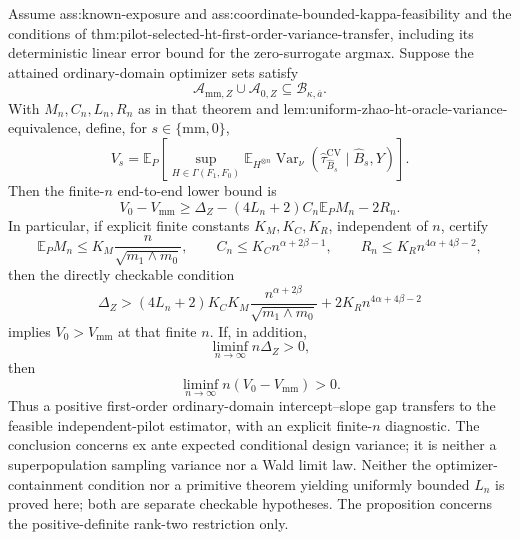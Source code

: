 Assume ass:known-exposure and ass:coordinate-bounded-kappa-feasibility and the conditions of thm:pilot-selected-ht-first-order-variance-transfer, including its deterministic linear error bound for the zero-surrogate argmax.  Suppose the attained ordinary-domain optimizer sets satisfy
\[
\mathcal A_{\mathrm{mm},Z}\cup\mathcal A_{0,Z}
\subseteq\mathcal B_{\kappa,\overline a}.
\]
With \(M_n,C_n,L_n,R_n\) as in that theorem and lem:uniform-zhao-ht-oracle-variance-equivalence, define, for \(s\in\{\mathrm{mm},0\}\),
\[
V_s=
\mathbb E_P\left[
\sup_{H\in\Gamma(F_1,F_0)}
\mathbb E_{H^{\otimes n}}
\operatorname{Var}_\nu
(\widehat\tau_{\widehat B_s}^{\mathrm{CV}}\mid\widehat B_s,Y)
\right].
\]
Then the finite-\(n\) end-to-end lower bound is
\[
V_0-V_{\mathrm{mm}}
\ge
\Delta_Z-(4L_n+2)C_n\mathbb E_PM_n-2R_n.
\]
In particular, if explicit finite constants \(K_M,K_C,K_R\), independent of \(n\), certify
\[
\mathbb E_PM_n\le K_M\frac{n}{\sqrt{m_1\wedge m_0}},
\qquad
C_n\le K_Cn^{\alpha+2\beta-1},
\qquad
R_n\le K_Rn^{4\alpha+4\beta-2},
\]
then the directly checkable condition
\[
\Delta_Z>
(4L_n+2)K_CK_M
\frac{n^{\alpha+2\beta}}{\sqrt{m_1\wedge m_0}}
+2K_Rn^{4\alpha+4\beta-2}
\]
implies \(V_0>V_{\mathrm{mm}}\) at that finite \(n\).  If, in addition,
\[
\liminf_{n\to\infty}n\Delta_Z>0,
\]
then
\[
\liminf_{n\to\infty}n(V_0-V_{\mathrm{mm}})>0.
\]
Thus a positive first-order ordinary-domain intercept--slope gap transfers to the feasible independent-pilot estimator, with an explicit finite-\(n\) diagnostic.  The conclusion concerns ex ante expected conditional design variance; it is neither a superpopulation sampling variance nor a Wald limit law.  Neither the optimizer-containment condition nor a primitive theorem yielding uniformly bounded \(L_n\) is proved here; both are separate checkable hypotheses.  The proposition concerns the positive-definite rank-two restriction only.